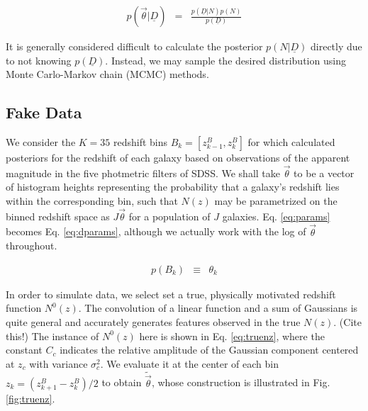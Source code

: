 \documentclass[12pt, onecolumn]{emulateapj}
\newcommand{\textul}{\underline}
\begin{document}
\begin{eqnarray}
\label{eq:bayes}
p(\vec{\theta}|\textul{D}) &=& \frac{p(\textul{D}|N)p(N)}{p(\textul{D})}
\end{eqnarray}

It is generally considered difficult to calculate the posterior $p(N|\textul{D})$ directly due to not knowing $p(\textul{D})$.  Instead, we may sample the desired distribution using Monte Carlo-Markov chain (MCMC) methods.  

\subsection{Fake Data}
\label{sec:fake}

We consider the $K=35$ redshift bins $B_{k}=[z^{B}_{k-1},z^{B}_{k}]$ for which \citet{she11} calculated posteriors for the redshift of each galaxy based on observations of the apparent magnitude in the five photmetric filters of SDSS.  We shall take $\vec{\theta}$ to be a vector of histogram heights representing the probability that a galaxy's redshift lies within the corresponding bin, such that $N(z)$ may be parametrized on the binned redshift space as $J\vec{\theta}$ for a population of $J$ galaxies.  Eq. \ref{eq:params} becomes Eq. \ref{eq:dparams}, although we actually work with the log of $\vec{\theta}$ throughout.  

\begin{eqnarray}
\label{eq:dparams}
p(B_{k}) &\equiv& \theta_{k}%
\end{eqnarray}

In order to simulate data, we select set a true, physically motivated redshift function $N^{0}(z)$.  The convolution of a linear function and a sum of Gaussians is quite general and accurately generates features observed in the true $N(z)$.  (Cite this!)  The instance of $N^{0}(z)$ here is shown in Eq. \ref{eq:truenz}, where the constant $C_{c}$ indicates the relative amplitude of the Gaussian component centered at $z_{c}$ with variance $\sigma_{c}^{2}$.  We evaluate it at the center of each bin $z_{k}=(z_{k+1}^{B}-z_{k}^{B})/2$ to obtain $\tilde{\vec{\theta}}$, whose construction is illustrated in Fig. \ref{fig:truenz}.
\end{document}
